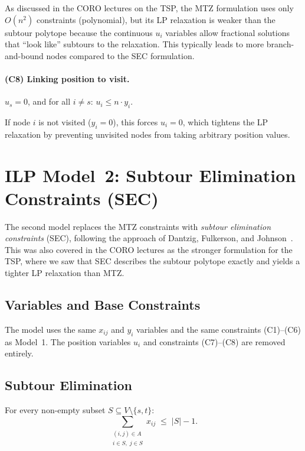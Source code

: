 \documentclass[12pt, a4paper]{article}
\begin{document}
As discussed in the CORO lectures on the TSP, the MTZ formulation uses only
$O(n^2)$ constraints (polynomial), but its LP relaxation is weaker than the subtour
polytope because the continuous $u_i$ variables allow fractional solutions that
``look like'' subtours to the relaxation. This typically leads to more
branch-and-bound nodes compared to the SEC formulation.

\paragraph{(C8) Linking position to visit.}
$u_s = 0$, and for all $i \neq s$: $u_i \leq n \cdot y_i$.

If node $i$ is not visited ($y_i = 0$), this forces $u_i = 0$, which tightens the
LP relaxation by preventing unvisited nodes from taking arbitrary position values.


\section{ILP Model~2: Subtour Elimination Constraints (SEC)}

The second model replaces the MTZ constraints with \emph{subtour elimination
constraints} (SEC), following the approach of Dantzig, Fulkerson, and
Johnson~\cite{dantzig}. This was also covered in the CORO lectures as the
stronger formulation for the TSP, where we saw that SEC describes the subtour
polytope exactly and yields a tighter LP relaxation than MTZ.

\subsection{Variables and Base Constraints}

The model uses the same $x_{ij}$ and $y_i$ variables and the same constraints
(C1)--(C6) as Model~1. The position variables $u_i$ and constraints (C7)--(C8) are
removed entirely.

\subsection{Subtour Elimination}

For every non-empty subset $S \subseteq V \setminus \{s,t\}$:
\begin{equation}\label{eq:sec}
  \sum_{\substack{(i,j) \in A \\ i \in S,\; j \in S}} x_{ij}
  \;\leq\; |S| - 1.
  \tag{SEC}
\end{equation}
\end{document}

